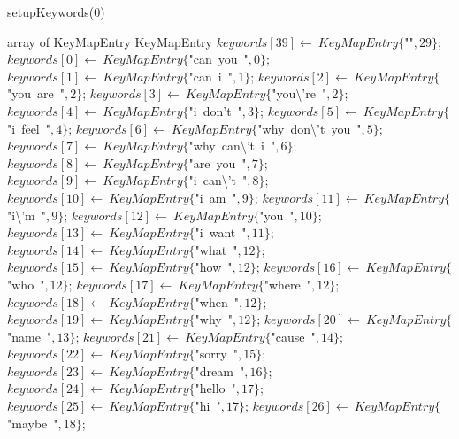 \documentclass[a4paper,10pt]{article}
\begin{document}
\begin{algorithm}
\caption{setupKeywords(0)}
\begin{algorithmic}[5]
\State {}
\State {}
\State {}
    \State array of KeyMapEntry
  \EndDecl
    \State KeyMapEntry
  \EndDecl
  \State \(keywords[39]\gets\ KeyMapEntry\{\)"{}"{}\(,29\}\);
  \State \(keywords[0]\gets\ KeyMapEntry\{\)"{}can\ you\ "{}\(,0\}\);
  \State \(keywords[1]\gets\ KeyMapEntry\{\)"{}can\ i\ "{}\(,1\}\);
  \State \(keywords[2]\gets\ KeyMapEntry\{\)"{}you\ are\ "{}\(,2\}\);
  \State \(keywords[3]\gets\ KeyMapEntry\{\)"{}you\textbackslash{}'{}re\ "{}\(,2\}\);
  \State \(keywords[4]\gets\ KeyMapEntry\{\)"{}i\ don'{}t\ "{}\(,3\}\);
  \State \(keywords[5]\gets\ KeyMapEntry\{\)"{}i\ feel\ "{}\(,4\}\);
  \State \(keywords[6]\gets\ KeyMapEntry\{\)"{}why\ don\textbackslash{}'{}t\ you\ "{}\(,5\}\);
  \State \(keywords[7]\gets\ KeyMapEntry\{\)"{}why\ can\textbackslash{}'{}t\ i\ "{}\(,6\}\);
  \State \(keywords[8]\gets\ KeyMapEntry\{\)"{}are\ you\ "{}\(,7\}\);
  \State \(keywords[9]\gets\ KeyMapEntry\{\)"{}i\ can\textbackslash{}'{}t\ "{}\(,8\}\);
  \State \(keywords[10]\gets\ KeyMapEntry\{\)"{}i\ am\ "{}\(,9\}\);
  \State \(keywords[11]\gets\ KeyMapEntry\{\)"{}i\textbackslash{}'{}m\ "{}\(,9\}\);
  \State \(keywords[12]\gets\ KeyMapEntry\{\)"{}you\ "{}\(,10\}\);
  \State \(keywords[13]\gets\ KeyMapEntry\{\)"{}i\ want\ "{}\(,11\}\);
  \State \(keywords[14]\gets\ KeyMapEntry\{\)"{}what\ "{}\(,12\}\);
  \State \(keywords[15]\gets\ KeyMapEntry\{\)"{}how\ "{}\(,12\}\);
  \State \(keywords[16]\gets\ KeyMapEntry\{\)"{}who\ "{}\(,12\}\);
  \State \(keywords[17]\gets\ KeyMapEntry\{\)"{}where\ "{}\(,12\}\);
  \State \(keywords[18]\gets\ KeyMapEntry\{\)"{}when\ "{}\(,12\}\);
  \State \(keywords[19]\gets\ KeyMapEntry\{\)"{}why\ "{}\(,12\}\);
  \State \(keywords[20]\gets\ KeyMapEntry\{\)"{}name\ "{}\(,13\}\);
  \State \(keywords[21]\gets\ KeyMapEntry\{\)"{}cause\ "{}\(,14\}\);
  \State \(keywords[22]\gets\ KeyMapEntry\{\)"{}sorry\ "{}\(,15\}\);
  \State \(keywords[23]\gets\ KeyMapEntry\{\)"{}dream\ "{}\(,16\}\);
  \State \(keywords[24]\gets\ KeyMapEntry\{\)"{}hello\ "{}\(,17\}\);
  \State \(keywords[25]\gets\ KeyMapEntry\{\)"{}hi\ "{}\(,17\}\);
  \State \(keywords[26]\gets\ KeyMapEntry\{\)"{}maybe\ "{}\(,18\}\);

\end{algorithmic}
\end{algorithm}
\end{document}
